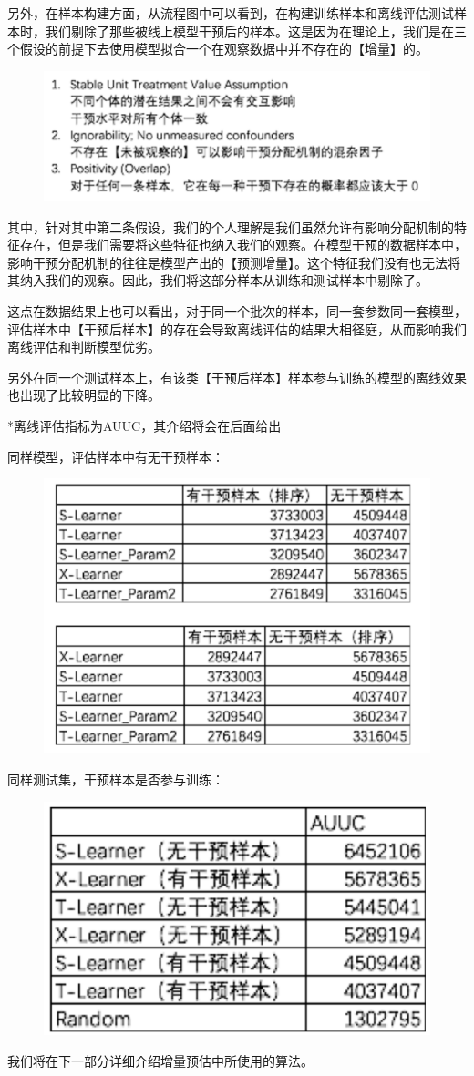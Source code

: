 \documentclass[12pt]{article}
\begin{document}
另外，在样本构建方面，从流程图中可以看到，在构建训练样本和离线评估测试样本时，我们剔除了那些被线上模型干预后的样本。这是因为在理论上，我们是在三个假设的前提下去使用模型拟合一个在观察数据中并不存在的【增量】的。
\begin{figure}[H]
    \centering
    \includegraphics[width=1\textwidth]{fig/Causal_Inference_In_DiDi_7.png}
\end{figure}

其中，针对其中第二条假设，我们的个人理解是我们虽然允许有影响分配机制的特征存在，但是我们需要将这些特征也纳入我们的观察。在模型干预的数据样本中，影响干预分配机制的往往是模型产出的【预测增量】。这个特征我们没有也无法将其纳入我们的观察。因此，我们将这部分样本从训练和测试样本中剔除了。

这点在数据结果上也可以看出，对于同一个批次的样本，同一套参数同一套模型，评估样本中【干预后样本】的存在会导致离线评估的结果大相径庭，从而影响我们离线评估和判断模型优劣。

另外在同一个测试样本上，有该类【干预后样本】样本参与训练的模型的离线效果也出现了比较明显的下降。

*离线评估指标为AUUC，其介绍将会在后面给出

同样模型，评估样本中有无干预样本：
\begin{figure}[H]
    \centering
    \includegraphics[width=.6\textwidth]{fig/Causal_Inference_In_DiDi_8.png}
\end{figure}

同样测试集，干预样本是否参与训练：
\begin{figure}[H]
    \centering
    \includegraphics[width=.6\textwidth]{fig/Causal_Inference_In_DiDi_9.png}
\end{figure}
我们将在下一部分详细介绍增量预估中所使用的算法。
\end{document}
